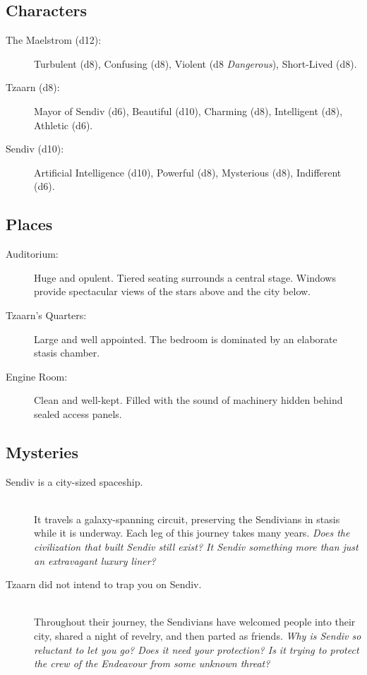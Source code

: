 \documentclass[11pt, a5paper, parskip=half-, DIV=12]{scrartcl}
\begin{document}
\newpage

\subsection*{Characters}
\begin{description}
	\item[The Maelstrom (d12):] Turbulent (d8), Confusing (d8), Violent (d8 \textit{Dangerous}), Short-Lived (d8).
	\item[Tzaarn (d8):] Mayor of Sendiv (d6), Beautiful (d10), Charming (d8), Intelligent (d8), Athletic (d6).
	\item[Sendiv (d10):] Artificial Intelligence (d10), Powerful (d8), Mysterious (d8), Indifferent (d6).
\end{description}

\subsection*{Places}
\begin{description}
	\item[Auditorium:] Huge and opulent. Tiered seating surrounds a central stage. Windows provide spectacular views of the stars above and the city below.
	\item[Tzaarn's Quarters:] Large and well appointed. The bedroom is dominated by an elaborate stasis chamber.
	\item[Engine Room:] Clean and well-kept. Filled with the sound of machinery hidden behind sealed access panels.
\end{description}

\subsection*{Mysteries}
\begin{description}
	\item[Sendiv is a city-sized spaceship.] \phantom{a} \\ It travels a galaxy-spanning circuit, preserving the Sendivians in stasis while it is underway. Each leg of this journey takes many years. \textit{Does the civilization that built Sendiv still exist? It Sendiv something more than just an extravagant luxury liner?}
	\item[Tzaarn did not intend to trap you on Sendiv.] \phantom{a} \\ Throughout their journey, the Sendivians have welcomed people into their city, shared a night of revelry, and then parted as friends. \textit{Why is Sendiv so reluctant to let you go? Does it need your protection? Is it trying to protect the crew of the Endeavour from some unknown threat?}
\end{description}
\end{document}
